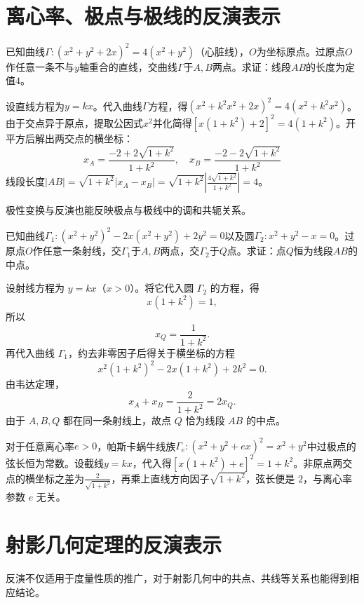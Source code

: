 \section{离心率、极点与极线的反演表示}

\begin{example}
已知曲线$\Gamma: (x^2+y^2+2x)^2 = 4(x^2+y^2)$（心脏线），$O$为坐标原点。过原点$O$作任意一条不与$y$轴重合的直线，交曲线$\Gamma$于$A, B$两点。求证：线段$AB$的长度为定值$4$。
\end{example}
\begin{solution}
设直线方程为$y = kx$。代入曲线$\Gamma$方程，得$(x^2 + k^2x^2 + 2x)^2 = 4(x^2 + k^2x^2)$。由于交点异于原点，提取公因式$x^2$并化简得$[x(1+k^2) + 2]^2 = 4(1+k^2)$。开平方后解出两交点的横坐标：
$$x_A = \frac{-2 + 2\sqrt{1+k^2}}{1+k^2}, \quad x_B = \frac{-2 - 2\sqrt{1+k^2}}{1+k^2}$$
线段长度$|AB| = \sqrt{1+k^2} |x_A - x_B| = \sqrt{1+k^2} \left| \frac{4\sqrt{1+k^2}}{1+k^2} \right| = 4$。
\end{solution}

极性变换与反演也能反映极点与极线中的调和共轭关系。

\begin{example}
已知曲线$\Gamma_1: (x^2+y^2)^2 - 2x(x^2+y^2) + 2y^2 = 0$以及圆$\Gamma_2: x^2+y^2 - x = 0$。过原点$O$作任意一条射线，交$\Gamma_1$于$A, B$两点，交$\Gamma_2$于$Q$点。求证：点$Q$恒为线段$AB$的中点。
\end{example}
\begin{solution}
设射线方程为 $y = kx$（$x > 0$）。将它代入圆 $\Gamma_2$ 的方程，得
\[
x(1+k^2)=1,
\]
所以
\[
x_Q=\frac{1}{1+k^2}.
\]
再代入曲线 $\Gamma_1$，约去非零因子后得关于横坐标的方程
\[
x^2(1+k^2)^2-2x(1+k^2)+2k^2=0.
\]
由韦达定理，
\[
x_A+x_B=\frac{2}{1+k^2}=2x_Q.
\]
由于 $A,B,Q$ 都在同一条射线上，故点 $Q$ 恰为线段 $AB$ 的中点。
\end{solution}

对于任意离心率$e > 0$，帕斯卡蜗牛线族$\Gamma_e: (x^2+y^2+ex)^2 = x^2+y^2$中过极点的弦长恒为常数。设截线$y = kx$，代入得$[x(1+k^2) + e]^2 = 1+k^2$。非原点两交点的横坐标之差为$\frac{2}{\sqrt{1+k^2}}$，再乘上直线方向因子$\sqrt{1+k^2}$，弦长便是 $2$，与离心率参数 $e$ 无关。

\section{射影几何定理的反演表示}

反演不仅适用于度量性质的推广，对于射影几何中的共点、共线等关系也能得到相应结论。

